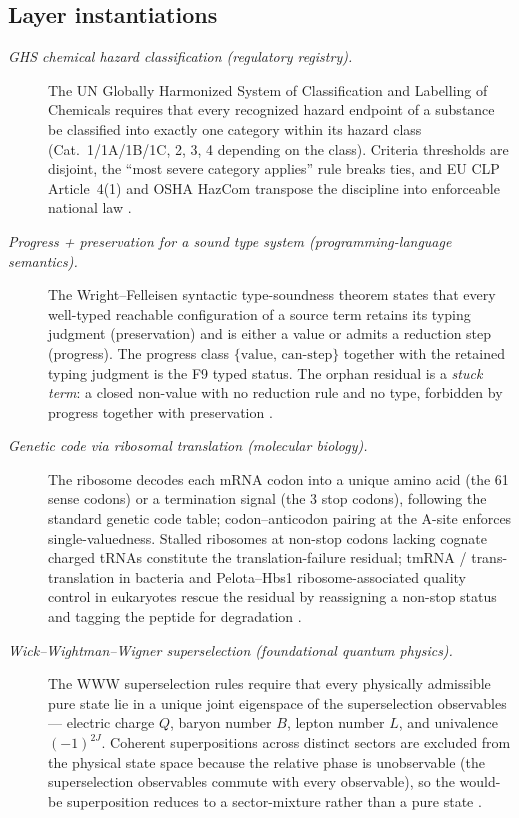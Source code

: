 \documentclass[11pt]{article}
\theoremstyle{definition}
\begin{document}
\subsection*{Layer instantiations}\label{layer-inst:F9}

\begin{description}
\item[\emph{{GHS} chemical hazard classification (regulatory
registry).}]
The UN Globally Harmonized System of Classification and Labelling of
Chemicals requires that every recognized hazard endpoint of a
substance be classified into exactly one category within its hazard
class (Cat.~1/1A/1B/1C, 2, 3, 4 depending on the class).  Criteria
thresholds are disjoint, the ``most severe category applies'' rule
breaks ties, and EU CLP Article~4(1) and OSHA HazCom transpose the
discipline into enforceable national law
\citep{UN2025GHSRev11}.

\item[\emph{Progress + preservation for a sound type system
(programming-language semantics).}]
The Wright--Felleisen syntactic type-soundness theorem states that
every well-typed reachable configuration of a source term retains
its typing judgment (preservation) and is either a value or admits
a reduction step (progress).  The progress class
\(\{\text{value},\,\text{can-step}\}\) together with the retained
typing judgment is the F9 typed status.  The orphan residual is a
\emph{stuck term}: a closed non-value with no reduction rule and no
type, forbidden by progress together with preservation
\citep{WrightFelleisen1994SyntacticTypeSoundness}.

\item[\emph{Genetic code via ribosomal translation (molecular
biology).}]
The ribosome decodes each mRNA codon into a unique amino acid (the
61 sense codons) or a termination signal (the 3 stop codons),
following the standard genetic code table; codon--anticodon pairing
at the A-site enforces single-valuedness.  Stalled ribosomes at
non-stop codons lacking cognate charged tRNAs constitute the
translation-failure residual; tmRNA / trans-translation in bacteria
and Pelota--Hbs1 ribosome-associated quality control in eukaryotes
rescue the residual by reassigning a non-stop status and tagging the
peptide for degradation
\citep{Crick1968OriginGeneticCode}.

\item[\emph{Wick--Wightman--Wigner superselection (foundational
quantum physics).}]
The WWW superselection rules require that every physically
admissible pure state lie in a unique joint eigenspace of the
superselection observables --- electric charge \(Q\), baryon number
\(B\), lepton number \(L\), and univalence \((-1)^{2J}\).
Coherent superpositions across distinct sectors are excluded from
the physical state space because the relative phase is unobservable
(the superselection observables commute with every observable), so
the would-be superposition reduces to a sector-mixture rather than a
pure state
\citep{WickWightmanWigner1952IntrinsicParity}.


\end{description}
\end{document}
